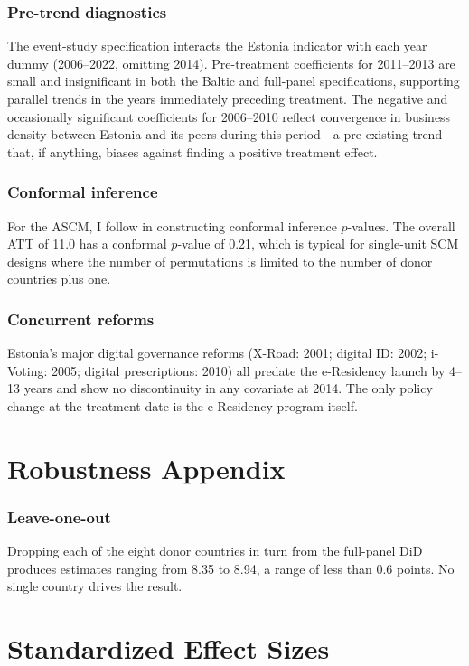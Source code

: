 \documentclass[12pt]{article}
\begin{document}
\subsubsection*{Pre-trend diagnostics} The event-study specification interacts the Estonia indicator with each year dummy (2006--2022, omitting 2014). Pre-treatment coefficients for 2011--2013 are small and insignificant in both the Baltic and full-panel specifications, supporting parallel trends in the years immediately preceding treatment. The negative and occasionally significant coefficients for 2006--2010 reflect convergence in business density between Estonia and its peers during this period---a pre-existing trend that, if anything, biases against finding a positive treatment effect.

\subsubsection*{Conformal inference} For the ASCM, I follow \citet{chernozhukov2021} in constructing conformal inference $p$-values. The overall ATT of 11.0 has a conformal $p$-value of 0.21, which is typical for single-unit SCM designs where the number of permutations is limited to the number of donor countries plus one.

\subsubsection*{Concurrent reforms} Estonia's major digital governance reforms (X-Road: 2001; digital ID: 2002; i-Voting: 2005; digital prescriptions: 2010) all predate the e-Residency launch by 4--13 years and show no discontinuity in any covariate at 2014. The only policy change at the treatment date is the e-Residency program itself.

\section{Robustness Appendix}
\label{app:robust}

\subsubsection*{Leave-one-out} Dropping each of the eight donor countries in turn from the full-panel DiD produces estimates ranging from 8.35 to 8.94, a range of less than 0.6 points. No single country drives the result.

\section{Standardized Effect Sizes}
\label{sec:sde}


\end{document}
